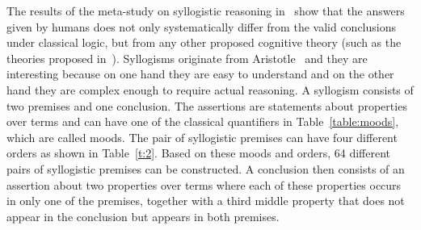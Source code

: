 \documentclass[12pt]{article}
\begin{document}
The results of the meta-study on syllogistic reasoning in~\cite{khemlani:2012} show that the answers given by humans does not only systematically differ from the valid conclusions under classical logic, but from any other proposed cognitive theory (such as the theories proposed in~\cite{BJ89,johnsonlaird:1983,Rips1994,Polk1995,chater:oaksford:1999}).
Syllogisms originate from Aristotle~\cite{aristotle} and
they are interesting because on one hand they are easy to understand and on the other hand
they are complex enough to require actual reasoning. 
A syllogism consists of two
premises and one conclusion. 
The assertions are statements about properties over terms and can have one of the classical quantifiers in Table~\ref{table:moods}, which are called moods. The pair of syllogistic premises can have four different orders as shown in Table~\ref{t:2}. Based on these moods and orders, 64 different pairs of syllogistic premises can be constructed.
A conclusion then consists of an assertion about two properties over terms where each of these properties occurs in only one of the premises, together with a third middle property that does not appear in the conclusion but appears in both premises. 
\end{document}
